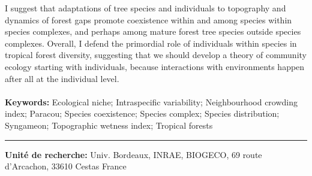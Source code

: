 {I suggest that adaptations of tree species and individuals to topography and dynamics of forest gaps promote coexistence within and among species within species complexes, and perhaps among mature forest tree species outside species complexes. Overall, I defend the primordial role of individuals within species in tropical forest diversity, suggesting that we should develop a theory of community ecology starting with individuals, because interactions with environments happen after all at the individual level. \\
\\
\textbf{Keywords:}
Ecological niche; Intraspecific variability; Neighbourhood crowding index; Paracou; Species coexistence; Species complex; Species distribution; Syngameon; Topographic wetness index;   Tropical forests
\newline\noindent\rule{\textwidth}{1pt}
\textbf{Unité de recherche:} Univ. Bordeaux, INRAE, BIOGECO, 69 route d’Arcachon, 33610 Cestas France
\par}
